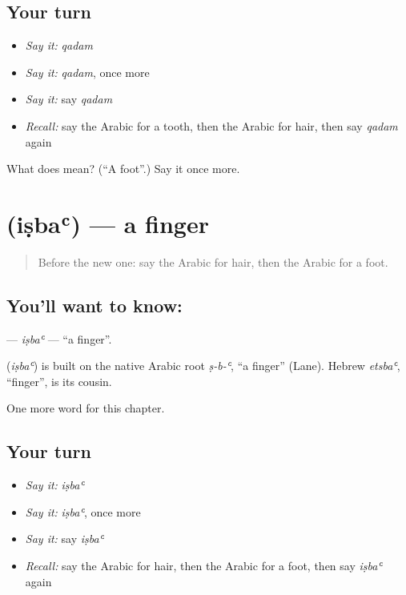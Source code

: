 \subsection*{Your turn}
\begin{itemize}
\raggedright
  \item \emph{Say it:} \emph{qadam}
  \item \emph{Say it:} \emph{qadam}, once more
  \item \emph{Say it:} say \emph{qadam}
  \item \emph{Recall:} say the Arabic for a tooth, then the Arabic for hair, then say \emph{qadam} again
\end{itemize}

\begin{tcolorbox}[breakable,colback=teal!4,colframe=teal!35!black,title={Before you move on}]
What does  mean? (\textquotedblleft{}A foot\textquotedblright{}.) Say it once more.
\end{tcolorbox}
\section[\texorpdfstring{\ar{إصبع} (iṣbaʿ)}{إصبع (iṣbaʿ)}]{ (iṣbaʿ) — a finger}

\label{lesson:AR-C51-isba}



\begin{quote}
Before the new one: say the Arabic for hair, then the Arabic for a foot.
\end{quote}

\subsection*{You'll want to know: }
\textbf{} — \emph{iṣbaʿ} — \textquotedblleft{}a finger\textquotedblright{}.

\begin{cousinweb}
\textbf{} (\emph{iṣbaʿ}) is built on the native Arabic root \emph{ṣ-b-ʿ}, \textquotedblleft{}a finger\textquotedblright{} (Lane). Hebrew \emph{etsbaʿ}, \textquotedblleft{}finger\textquotedblright{}, is its cousin.
\end{cousinweb}

\begin{grammarlens}[title={What you've built}]
One more word for this chapter.
\end{grammarlens}

\subsection*{Your turn}
\begin{itemize}
\raggedright
  \item \emph{Say it:} \emph{iṣbaʿ}
  \item \emph{Say it:} \emph{iṣbaʿ}, once more
  \item \emph{Say it:} say \emph{iṣbaʿ}
  \item \emph{Recall:} say the Arabic for hair, then the Arabic for a foot, then say \emph{iṣbaʿ} again
\end{itemize}

